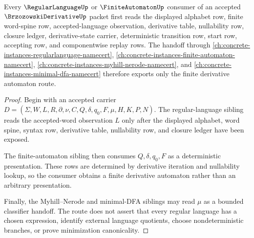 \begin{theorem}
\label{thm:brzozowski-derivative-regular-language-handoff}
Every $\RegularLanguageUp$ or $\FiniteAutomatonUp$ consumer of an accepted $\BrzozowskiDerivativeUp$ packet first reads the displayed alphabet row, finite word-spine row, accepted-language observation, derivative table, nullability row, closure ledger, derivative-state carrier, deterministic transition row, start row, accepting row, and componentwise replay rows. The handoff through \autoref{ch:concrete-instances-regularlanguage-namecert}, \autoref{ch:concrete-instances-finite-automaton-namecert}, \autoref{ch:concrete-instances-myhill-nerode-namecert}, and \autoref{ch:concrete-instances-minimal-dfa-namecert} therefore exports only the finite derivative automaton route.
\end{theorem}
\begin{proof}
Begin with an accepted carrier $D=(\Sigma,W,L,R,\partial,\nu,C,Q,\delta,q_0,F,\mu,H,K,P,N)$. The regular-language sibling reads the accepted-word observation $L$ only after the displayed alphabet, word spine, syntax row, derivative table, nullability row, and closure ledger have been exposed.

The finite-automaton sibling then consumes $Q,\delta,q_0,F$ as a deterministic presentation. These rows are determined by derivative iteration and nullability lookup, so the consumer obtains a finite derivative automaton rather than an arbitrary presentation.

Finally, the Myhill--Nerode and minimal-DFA siblings may read $\mu$ as a bounded classifier handoff. The route does not assert that every regular language has a chosen expression, identify external language quotients, choose nondeterministic branches, or prove minimization canonicality.
\end{proof}


